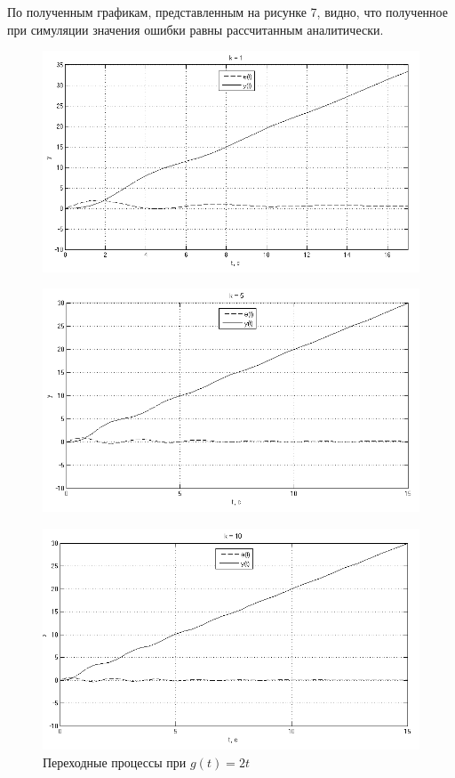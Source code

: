 \documentclass[a4paper, 11pt, russian]{article}
\begin{document}
    По полученным графикам, представленным на рисунке 7, видно, что полученное при симуляции значения ошибки равны рассчитанным аналитически.
    \begin{figure}[h!]
        \centering
        \includegraphics[scale = 0.58]{vInput1ast1k.png}
    \end{figure}
    \begin{figure}[h!]
        \centering
        \includegraphics[scale = 0.58]{vInput1ast5k.png}
    \end{figure}
    \begin{figure}[ht!]
        \centering
        \includegraphics[scale = 0.58]{vInput1ast10k.png}
        \caption{Переходные процессы при $g(t) = 2t$}
    \end{figure}
    
\end{document}
